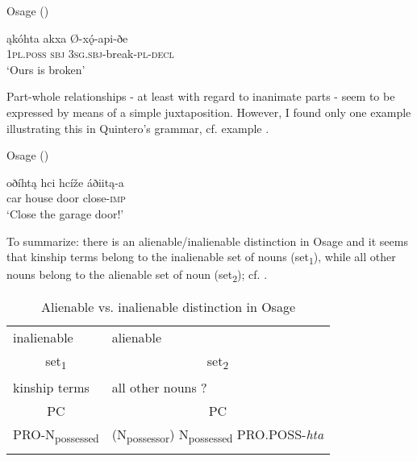 \documentclass[output=paper]{LSP/langsci}
\begin{document}
\ea	Osage (\citealt[413]{Quintero2004}) \label{osagebroken}

\gll ąkóhta     akxa     Ø-xǫ́-api-ðe \\
\textsc{1pl.poss} \textsc{sbj} \textsc{3sg.sbj}-break-\textsc{pl-decl} \\
\glt `Ours is broken'
\z 

Part-whole relationships - at least with regard to inanimate parts - seem to be expressed by means of a simple juxtaposition. However, I found only one example illustrating this in Quintero's grammar, cf. example .

\ea	Osage (\citealt[423]{Quintero2004}) \label{osagegarage}

\gll oðíhtą hci      hcíže áðiitą-a \\
car       house door close-\textsc{imp} \\
\glt `Close the garage door!'
\z

To summarize: there is an alienable/inalienable distinction in Osage and it seems that kinship terms belong to the inalienable set of nouns (set\textsubscript{1}), while all other nouns belong to the alienable set of noun (set\textsubscript{2}); cf. .

\begin{table}
\caption{Alienable vs. inalienable distinction in Osage} \label{osagealienability}
\begin{tabular}{ l l }
\lsptoprule
inalienable & alienable \\
 \multicolumn{1}{c}{set\textsubscript{1}} &  \multicolumn{1}{c}{set\textsubscript{2}} \\
\midrule
 
kinship terms & 	all other nouns ? \\
\midrule
 \multicolumn{1}{c}{PC}	&  \multicolumn{1}{c}{PC} \\
\midrule
PRO-N\textsubscript{possessed} & (N\textsubscript{possessor}) N\textsubscript{possessed} PRO.POSS-\textit{hta} \\
\lspbottomrule
\end{tabular}
\end{table}
\end{document}
